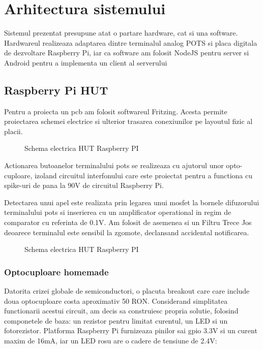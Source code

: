 \section {Arhitectura sistemului}

Sistemul prezentat presupune atat o partare hardware, cat si una software. Hardwareul realizeaza adaptarea dintre terminalul analog POTS si placa digitala de dezvoltare Raspberry Pi, iar ca software am folosit NodeJS pentru server si Android pentru a implementa un client al serverului

\subsection {Raspberry Pi HUT}

Pentru a proiecta un \acrfull{pcb} am folosit softwareul Fritzing. Acesta permite proiectarea schemei electrice si ulterior trasarea conexiunilor pe layoutul fizic al placii.

\begin{figure}[h!]
  \centering
  \caption{Schema electrica HUT Raspberry PI}
\end{figure}

Actionarea butoanelor terminalului \acrshort{pots} se realizeaza cu ajutorul unor opto-cuploare, izoland circuitul interfonului care este proiectat pentru a functiona cu spike-uri de pana la 90V de circuitul Raspberry Pi.

Detectarea unui apel este realizata prin legarea unui \acrfull{mosfet} la bornele difuzorului terminalului \acrshort{pots} si inserierea cu un amplificator operational in regim de comparator cu referinta de 0.1V. Am folosit de asemenea si un Filtru Trece Jos deoarece terminalul este sensibil la zgomote, declansand accidental notificarea.

\begin{figure}[h!]
  \centering
  \caption{Schema electrica HUT Raspberry PI}
\end{figure}

\subsubsection {Optocuploare homemade}

Datorita crizei globale de semiconductori, o placuta breakout care care include doua optocuploare costa aproximativ 50 RON. Considerand simplitatea functionarii acestui circuit, am decis sa construiesc propria solutie, folosind componetele de baza: un rezistor pentru limitat curentul, un LED si un fotorezistor. Platforma Raspberry Pi furnizeaza pinilor sai \acrshort{gpio} 3.3V si un curent maxim de 16mA, iar un LED rosu are o cadere de tensiune de 2.4V:

